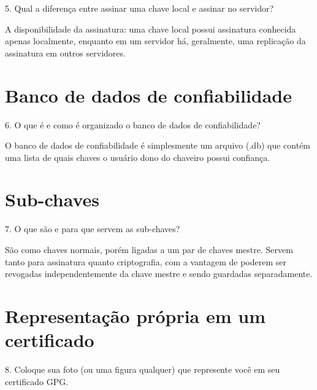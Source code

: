 \documentclass{article}
\begin{document}
    \begin{superframe}
        5. Qual a diferença entre assinar uma chave local e assinar no
        servidor?
    \end{superframe}

     A disponibilidade da assinatura: uma chave local possui assinatura
     conhecida apenas localmente, enquanto em um servidor há, geralmente, uma
     replicação da assinatura em outros servidores.

    \section{Banco de dados de confiabilidade}

    \begin{superframe}
        6. O que é e como é organizado o banco de dados de confiabilidade?
    \end{superframe}

    O banco de dados de confiabilidade é simplesmente um arquivo (.db) que
    contém uma lista de quais chaves o usuário dono do chaveiro possui
    confiança.

    \section{Sub-chaves}

    \begin{superframe}
        7. O que são e para que servem as sub-chaves?
    \end{superframe}

    São como chaves normais, porém ligadas a um par de chaves mestre. Servem
    tanto para assinatura quanto criptografia, com a vantagem de poderem ser
    revogadas independentemente da chave mestre e sendo guardadas
    separadamente.

    \section{Representação própria em um certificado}

    \begin{superframe}
        8. Coloque sua foto (ou uma figura qualquer) que represente você em seu
        certificado GPG\@.
    \end{superframe}
\end{document}
